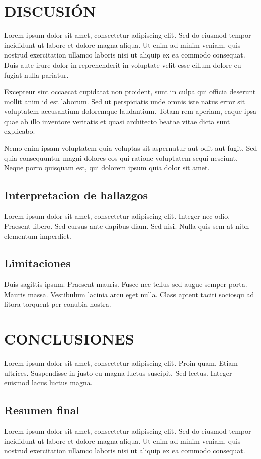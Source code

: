 \documentclass[esp]{cesvi-class}
\begin{document}
\section{DISCUSIÓN}
Lorem ipsum dolor sit amet, consectetur adipiscing elit. Sed do eiusmod tempor incididunt ut labore et dolore magna aliqua. Ut enim ad minim veniam, quis nostrud exercitation ullamco laboris nisi ut aliquip ex ea commodo consequat. Duis aute irure dolor in reprehenderit in voluptate velit esse cillum dolore eu fugiat nulla pariatur.

Excepteur sint occaecat cupidatat non proident, sunt in culpa qui officia deserunt mollit anim id est laborum. Sed ut perspiciatis unde omnis iste natus error sit voluptatem accusantium doloremque laudantium. Totam rem aperiam, eaque ipsa quae ab illo inventore veritatis et quasi architecto beatae vitae dicta sunt explicabo.

Nemo enim ipsam voluptatem quia voluptas sit aspernatur aut odit aut fugit. Sed quia consequuntur magni dolores eos qui ratione voluptatem sequi nesciunt. Neque porro quisquam est, qui dolorem ipsum quia dolor sit amet.

\subsection{Interpretacion de hallazgos}
Lorem ipsum dolor sit amet, consectetur adipiscing elit. Integer nec odio. Praesent libero. Sed cursus ante dapibus diam. Sed nisi. Nulla quis sem at nibh elementum imperdiet.

\subsection{Limitaciones}
Duis sagittis ipsum. Praesent mauris. Fusce nec tellus sed augue semper porta. Mauris massa. Vestibulum lacinia arcu eget nulla. Class aptent taciti sociosqu ad litora torquent per conubia nostra.

\section{CONCLUSIONES}
Lorem ipsum dolor sit amet, consectetur adipiscing elit. Proin quam. Etiam ultrices. Suspendisse in justo eu magna luctus suscipit. Sed lectus. Integer euismod lacus luctus magna.

\subsection{Resumen final}
Lorem ipsum dolor sit amet, consectetur adipiscing elit. Sed do eiusmod tempor incididunt ut labore et dolore magna aliqua. Ut enim ad minim veniam, quis nostrud exercitation ullamco laboris nisi ut aliquip ex ea commodo consequat.
\end{document}
